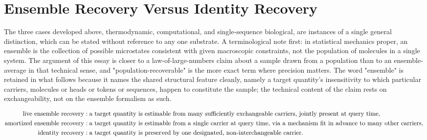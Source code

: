 \documentclass[11pt]{article}
\begin{document}
\section{Ensemble Recovery Versus Identity Recovery}

The three cases developed above, thermodynamic, computational, and single-sequence biological, are instances of a single general distinction, which can be stated without reference to any one substrate. A terminological note first: in statistical mechanics proper, an ensemble is the collection of possible microstates consistent with given macroscopic constraints, not the population of molecules in a single system. The argument of this essay is closer to a law-of-large-numbers claim about a sample drawn from a population than to an ensemble-average in that technical sense, and "population-recoverable" is the more exact term where precision matters. The word "ensemble" is retained in what follows because it names the shared structural feature cleanly, namely a target quantity's insensitivity to which particular carriers, molecules or heads or tokens or sequences, happen to constitute the sample; the technical content of the claim rests on exchangeability, not on the ensemble formalism as such.

\begin{align}
\text{live ensemble recovery} &: \text{a target quantity is estimable from many sufficiently exchangeable carriers, jointly present at query time}, \notag \\
\text{amortized ensemble recovery} &: \text{a target quantity is estimable from a single carrier at query time, via a mechanism fit in advance to many other carriers}, \notag \\
\text{identity recovery} &: \text{a target quantity is preserved by one designated, non-interchangeable carrier}. \notag
\end{align}
\end{document}
